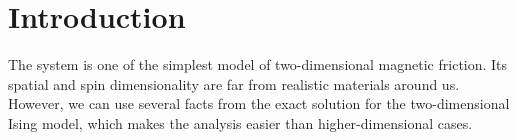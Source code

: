 \chapter{Introduction}

The system is one of the simplest model of two-dimensional magnetic friction. Its spatial and spin dimensionality are far from realistic materials around us. However, we can use several facts from the exact solution for the two-dimensional Ising model, which makes the analysis easier than higher-dimensional cases.